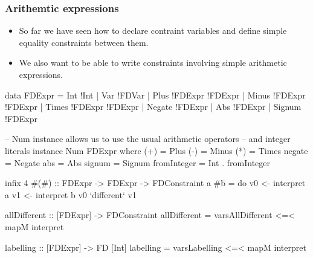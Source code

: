 \documentclass[aspectratio=169,hyphens]{beamer} %
\begin{document}
\begin{frame}[fragile]
    \frametitle{Arithemtic expressions}
    \begin{itemize}
        \item So far we have seen how to declare contraint variables and define simple equality constraints
            between them.
        \item We also want to be able to write constraints involving simple arithmetic expressions.
    \end{itemize}
\end{frame}
\begin{frame}[fragile]
    \begin{code}
data FDExpr
    = Int !Int
    | Var !FDVar
    | Plus !FDExpr !FDExpr
    | Minus !FDExpr !FDExpr
    | Times !FDExpr !FDExpr
    | Negate !FDExpr
    | Abs !FDExpr
    | Signum !FDExpr

-- Num instance allows us to use the usual arithmetic operators
-- and integer literals
instance Num FDExpr where
    (+) = Plus
    (-) = Minus
    (*) = Times
    negate = Negate
    abs = Abs
    signum = Signum
    fromInteger = Int . fromInteger
    \end{code}
\end{frame}

\begin{frame}[fragile]
\end{frame}

\begin{frame}[fragile]
    \begin{code}
infix 4 #\=
(#\=) :: FDExpr -> FDExpr -> FDConstraint
a #\= b = do
    v0 <- interpret a
    v1 <- interpret b
    v0 `different` v1

allDifferent :: [FDExpr] -> FDConstraint
allDifferent = varsAllDifferent <=< mapM interpret

labelling :: [FDExpr] -> FD [Int]
labelling = varsLabelling <=< mapM interpret
    \end{code}
\end{frame}
\end{document}

